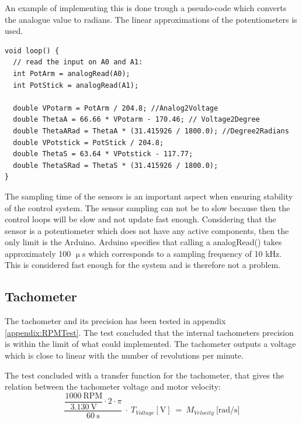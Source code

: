An example of implementing this is done trough a pseudo-code which converts the analogue value to radians. The linear approximations of the potentiometers is used.
\begin{lstlisting}
void loop() {
  // read the input on A0 and A1:
  int PotArm = analogRead(A0);
  int PotStick = analogRead(A1);

  double VPotarm = PotArm / 204.8; //Analog2Voltage
  double ThetaA = 66.66 * VPotarm - 170.46; // Voltage2Degree
  double ThetaARad = ThetaA * (31.415926 / 1800.0); //Degree2Radians
  double VPotstick = PotStick / 204.8;
  double ThetaS = 63.64 * VPotstick - 117.77;
  double ThetaSRad = ThetaS * (31.415926 / 1800.0);
}
\end{lstlisting}    

The sampling time of the sensors is an important aspect when ensuring stability of the control system. The sensor sampling can not be to slow because then the control loops will be slow and not update fast enough. Considering that the sensor is a potentiometer which does not have any active components, then the only limit is the Arduino. Arduino specifies that calling a analogRead() takes approximately 100 $\upmu$s which corresponds to a sampling frequency of 10 kHz. This is considered fast enough for the system and is therefore not a problem. 

\subsection*{Tachometer}
The tachometer and its precision has been tested in appendix \ref{appendix:RPMTest}. The test concluded that the internal tachometers precision is within the limit of what could implemented. The tachometer outputs a voltage which is close to linear with the number of revolutions per minute.

The test concluded with a transfer function for the tachometer, that gives the relation between the tachometer voltage and motor velocity:
\begin{equation}
\dfrac{\dfrac{1000\ \text{RPM}}{3.130\ \text{V}} \cdot 2 \cdot \pi}{60\ \text{s}}\ \cdot\ T_{Voltage}[\text{V}]\ =\ M_{Velocity}\ \text{[rad/s]}
\end{equation}


